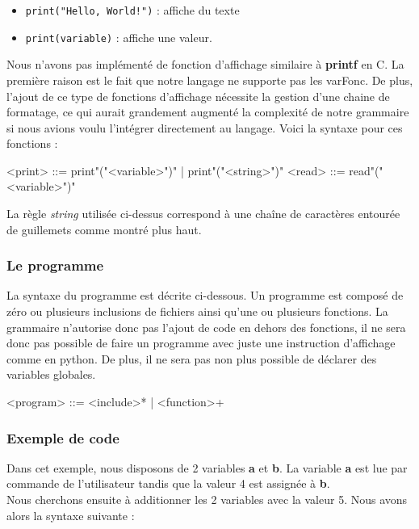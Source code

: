 \documentclass[a4paper]{article}%
\begin{document}
\begin{itemize}
  \item \lstinline{print("Hello, World!")} : affiche du texte
  \item \lstinline{print(variable)} : affiche une valeur.
\end{itemize}

Nous n'avons pas implémenté de fonction d'affichage similaire à \textbf{printf}
en C. La première raison est le fait que notre langage ne supporte pas les
\gls{varFonc}. De plus, l'ajout de ce type de fonctions d'affichage nécessite la
gestion d'une chaine de formatage, ce qui aurait grandement augmenté la
complexité de notre grammaire si nous avions voulu l'intégrer directement au
langage. Voici la syntaxe pour ces fonctions :

\begin{grammar}
  <print> ::= print"("<variable>")" | print"("<string>")"
  <read> ::= read"("<variable>")"
\end{grammar}\leavevmode\newline

La règle \textit{string} utilisée ci-dessus correspond à une chaîne de caractères
entourée de guillemets comme montré plus haut.

\subsubsection*{Le programme}

La syntaxe du programme est décrite ci-dessous. Un programme est composé de zéro
ou plusieurs inclusions de fichiers ainsi qu'une ou plusieurs fonctions. La
grammaire n'autorise donc pas l'ajout de code en dehors des fonctions, il ne
sera donc pas possible de faire un programme avec juste une instruction
d'affichage comme en python. De plus, il ne sera pas non plus possible de
déclarer des variables globales.

\begin{grammar}
  <program> ::= <include>* | <function>+
\end{grammar}\leavevmode\newline

\subsubsection*{Exemple de code}

Dans cet exemple, nous disposons de 2 variables \textbf{a} et \textbf{b}. La
variable \textbf{a} est lue par commande de l'utilisateur tandis que la valeur 4
est assignée à \textbf{b}.\\
Nous cherchons ensuite à additionner les 2 variables avec la valeur 5. Nous
avons alors la syntaxe suivante :\\
\end{document}
